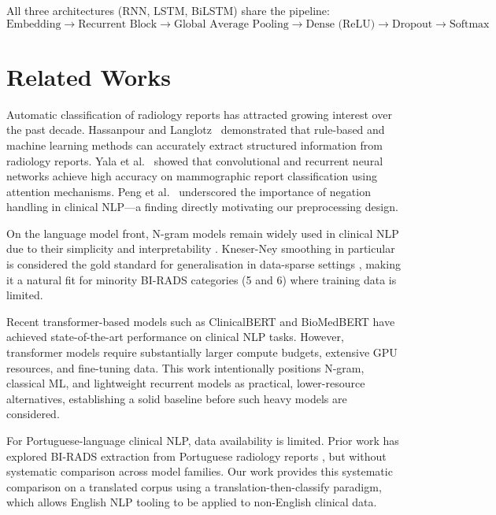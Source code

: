 \documentclass[11pt,a4paper]{article}
\begin{document}
All three architectures (RNN, LSTM, BiLSTM) share the pipeline:
\[
  \text{Embedding} \to \text{Recurrent Block} \to \text{Global Average Pooling}
  \to \text{Dense (ReLU)} \to \text{Dropout} \to \text{Softmax}
\]

\section{Related Works}

Automatic classification of radiology reports has attracted growing interest
over the past decade.
Hassanpour and Langlotz~\cite{hassanpour2017information}
demonstrated that rule-based and machine learning methods can accurately extract
structured information from radiology reports.
Yala et al.~\cite{yala2017clinical} showed that convolutional
and recurrent neural networks achieve high accuracy on mammographic report
classification using attention mechanisms.
Peng et al.~\cite{peng2018negation} underscored the
importance of negation handling in clinical NLP---a finding directly motivating
our preprocessing design.

On the language model front, N-gram models remain widely used in clinical NLP
due to their simplicity and interpretability
\cite{friedman2004natural}.
Kneser-Ney smoothing in particular is considered the gold standard for
generalisation in data-sparse settings \cite{chen1998evaluation}, making it
a natural fit for minority BI-RADS categories (5 and 6) where training data
is limited.

Recent transformer-based models such as ClinicalBERT \cite{alsentzer2019publicly}
and BioMedBERT have achieved state-of-the-art performance on clinical NLP tasks.
However, transformer models require substantially larger compute budgets,
extensive GPU resources, and fine-tuning data.
This work intentionally positions N-gram, classical ML, and lightweight
recurrent models as practical, lower-resource alternatives, establishing
a solid baseline before such heavy models are considered.

For Portuguese-language clinical NLP, data availability is limited.
Prior work has explored BI-RADS extraction from Portuguese radiology reports
\cite{pestana2019breast}, but without systematic comparison
across model families.
Our work provides this systematic comparison on a translated corpus using a
translation-then-classify paradigm, which allows English NLP tooling to be
applied to non-English clinical data.
\end{document}
